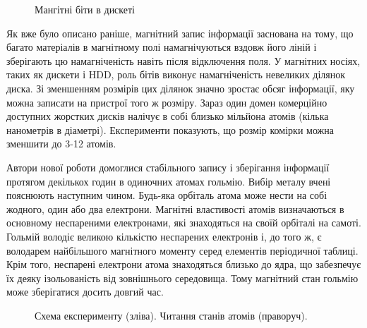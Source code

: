 \documentclass[a4paper,14pt]{extreport}
\begin{document}
\begin{figure}[h]
  \caption{Мангітні біти в дискеті}
  \label{ris5}
\end{figure}

Як вже було описано раніше, магнітний запис інформації заснована на тому, що багато матеріалів в магнітному полі намагнічуються вздовж його ліній і зберігають цю намагніченість навіть після відключення поля. У магнітних носіях, таких як дискети і HDD, роль бітів виконує намагніченість невеликих ділянок диска. Зі зменшенням розмірів цих ділянок значно зростає обсяг інформації, яку можна записати на пристрої того ж розміру. Зараз один домен комерційно доступних жорстких дисків налічує в собі близько мільйона атомів (кілька нанометрів в діаметрі). Експерименти показують, що розмір комірки можна зменшити до 3-12 атомів.\par

Автори нової роботи домоглися стабільного запису і зберігання інформації протягом декількох годин в одиночних атомах гольмію. Вибір металу вчені пояснюють наступним чином. Будь-яка орбіталь атома може нести на собі жодного, один або два електрони. Магнітні властивості атомів визначаються в основному неспареними електронами, які знаходяться на своїй орбіталі на самоті. Гольмій володіє великою кількістю неспарених електронів і, до того ж, є володарем найбільшого магнітного моменту серед елементів періодичної таблиці. Крім того, неспарені електрони атома знаходяться близько до ядра, що забезпечує їх деяку ізольованість від зовнішнього середовища. Тому магнітний стан гольмію може зберігатися досить довгий час.\par

\begin{figure}[h]
  \caption{Схема експерименту (зліва). Читання станів атомів (праворуч).}
  \label{ris6}
\end{figure}
\end{document}
